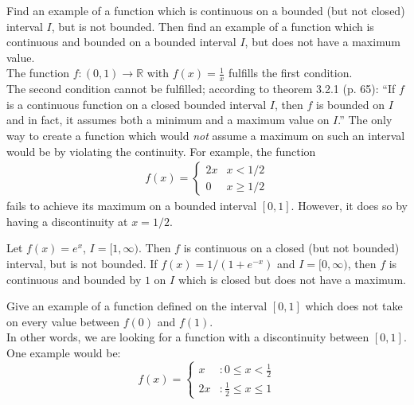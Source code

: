 \documentclass[12pt]{book}
\newcommand{\R}{\mathbb{R}}
\newenvironment{exercise}[2][Exercise]{\begin{trivlist}
\item[\hskip \labelsep {\bfseries #1}\hskip \labelsep {\bfseries #2.}]}{\end{trivlist}}
\begin{document}
\begin{exercise}{3.2.4}
Find an example of a function which is continuous on a bounded (but not closed) interval $I$, but is not bounded. Then find an example of a function which is continuous and bounded on a bounded interval $I$, but does not have a maximum value. \\

The function $f: (0,1) \to \R$ with $f(x)=\frac{1}{x}$ fulfills the first condition. \\
The second condition cannot be fulfilled; according to theorem 3.2.1 (p. 65): ``If $f$ is a continuous function on a closed bounded interval $I$, then $f$ is bounded on $I$ and in fact, it assumes both a minimum and a maximum value on $I$.'' The only way to create a function which would \emph{not} assume a maximum on such an interval would be by violating the continuity. For example, the function	
	\begin{align*}
	f(x) =
		\begin{cases}
		2x & x< 1/2 \\
		0  & x \geq 1/2
		\end{cases}
	\end{align*}
fails to achieve its maximum on a bounded interval $[0,1]$. However, it does so by having a discontinuity at $x = 1/2$.
\end{exercise}

\begin{exercise}{3.2.5}
Let $f(x) = e^x$, $I = [1, \infty)$. Then $f$ is continuous on a closed (but not bounded) interval, but is not bounded. If $f(x) = 1/(1+e^{-x})$ and $I = [0, \infty)$, then $f$ is continuous and bounded by $1$ on $I$ which is closed but does not have a maximum. 
\end{exercise}


\begin{exercise}{3.2.7}
Give an example of a function defined on the interval $[0,1]$ which does not take on every value between $f(0)$ and $f(1)$. \\

In other words, we are looking for a function with a discontinuity between $[0,1]$. One example would be:
 \begin{displaymath}
   f(x) = \left\{
     \begin{array}{lr}
       x & : 0 \leq x < \frac{1}{2} \\
       2x & : \frac{1}{2} \leq x \leq 1
     \end{array}
   \right.
\end{displaymath} 

\end{exercise}
\end{document}
